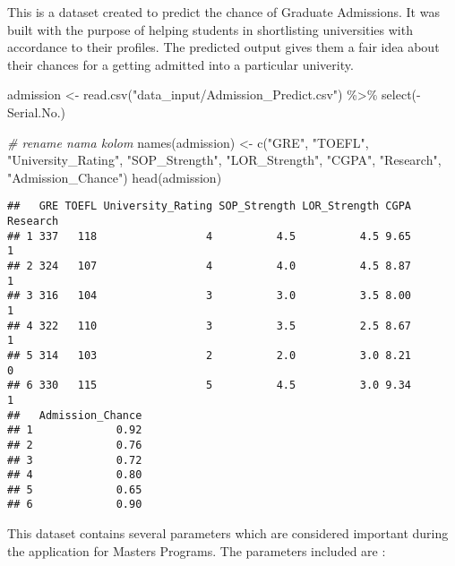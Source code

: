 \documentclass[
  ignorenonframetext,
]{beamer}
\newenvironment{Shaded}{\begin{snugshade}}{\end{snugshade}}
\newcommand{\CommentTok}[1]{\textcolor[rgb]{0.56,0.35,0.01}{\textit{#1}}}
\newcommand{\FunctionTok}[1]{\textcolor[rgb]{0.00,0.00,0.00}{#1}}
\newcommand{\NormalTok}[1]{#1}
\newcommand{\OtherTok}[1]{\textcolor[rgb]{0.56,0.35,0.01}{#1}}
\newcommand{\SpecialCharTok}[1]{\textcolor[rgb]{0.00,0.00,0.00}{#1}}
\newcommand{\StringTok}[1]{\textcolor[rgb]{0.31,0.60,0.02}{#1}}
\begin{document}
\begin{frame}[fragile]
This is a dataset created to predict the chance of Graduate Admissions.
It was built with the purpose of helping students in shortlisting
universities with accordance to their profiles. The predicted output
gives them a fair idea about their chances for a getting admitted into a
particular univerity.

\begin{Shaded}
\begin{Highlighting}[]
\NormalTok{admission }\OtherTok{\textless{}{-}} \FunctionTok{read.csv}\NormalTok{(}\StringTok{"data\_input/Admission\_Predict.csv"}\NormalTok{) }\SpecialCharTok{\%\textgreater{}\%} 
              \FunctionTok{select}\NormalTok{(}\SpecialCharTok{{-}}\NormalTok{Serial.No.)}

\CommentTok{\# rename nama kolom}
\FunctionTok{names}\NormalTok{(admission) }\OtherTok{\textless{}{-}} \FunctionTok{c}\NormalTok{(}\StringTok{"GRE"}\NormalTok{, }\StringTok{"TOEFL"}\NormalTok{, }\StringTok{"University\_Rating"}\NormalTok{, }\StringTok{"SOP\_Strength"}\NormalTok{, }\StringTok{"LOR\_Strength"}\NormalTok{, }\StringTok{"CGPA"}\NormalTok{, }\StringTok{"Research"}\NormalTok{, }\StringTok{"Admission\_Chance"}\NormalTok{)}
\FunctionTok{head}\NormalTok{(admission)}
\end{Highlighting}
\end{Shaded}

\begin{verbatim}
##   GRE TOEFL University_Rating SOP_Strength LOR_Strength CGPA Research
## 1 337   118                 4          4.5          4.5 9.65        1
## 2 324   107                 4          4.0          4.5 8.87        1
## 3 316   104                 3          3.0          3.5 8.00        1
## 4 322   110                 3          3.5          2.5 8.67        1
## 5 314   103                 2          2.0          3.0 8.21        0
## 6 330   115                 5          4.5          3.0 9.34        1
##   Admission_Chance
## 1             0.92
## 2             0.76
## 3             0.72
## 4             0.80
## 5             0.65
## 6             0.90
\end{verbatim}

This dataset contains several parameters which are considered important
during the application for Masters Programs. The parameters included are
:


\end{frame}
\end{document}
